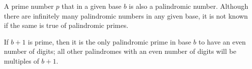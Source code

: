 \documentclass[12pt]{article}
\begin{document}
A prime number $p$ that in a given base $b$ is also a palindromic number. Although there are infinitely many palindromic numbers in any given base, it is not known if the same is true of palindromic primes.

If $b + 1$ is prime, then it is the only palindromic prime in base $b$ to have an even number of digits; all other palindromes with an even number of digits will be multiples of $b + 1$.
\end{document}
